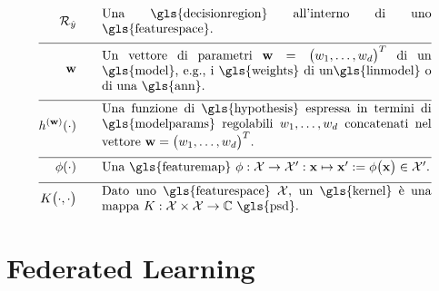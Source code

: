 \begin{align}
\decreg{\hat{\truelabel}} \quad\quad &\parbox{.75\textwidth}{Una \gls{decisionregion} all'interno di uno \gls{featurespace}.  }\nonumber \\[2mm] \hline \nonumber\\[-5mm]  
	\weights  \quad\quad & \parbox{.75\textwidth}{Un vettore di parametri $\weights = \big(\weight_{1},\ldots,\weight_{\featuredim}\big)^{T}$ 
		di un \gls{model}, e.g., i \gls{weights} di un\gls{linmodel} o di una \gls{ann}.}     \nonumber \\[2mm] \hline \nonumber\\[-5mm]
	\hypothesis^{(\weights)}(\cdot)  \quad\quad &\parbox{.75\textwidth}{Una funzione di \gls{hypothesis} espressa in termini di \gls{modelparams} regolabili $\weight_{1},\ldots,\weight_{\featuredim}$ concatenati nel vettore $\weights=\big(\weight_{1},\ldots,\weight_{\featuredim} \big)^{T}$.} \nonumber \\[2mm] \hline \nonumber\\[-5mm]
	\featuremap(\cdot)  \quad\quad & \parbox{.75\textwidth}{Una \gls{featuremap} $\featuremap: \featurespace \rightarrow \featurespace' : \featurevec \mapsto \featurevec' \defeq \featuremap\big( \featurevec \big) \in \featurespace'$.}   \nonumber \\[2mm] \hline \nonumber\\[-5mm]
	\kernelmap{\cdot}{\cdot} \quad\quad & \parbox{.75\textwidth}{Dato uno \gls{featurespace} $\featurespace$, 
		un \gls{kernel} è una mappa $\kernel: \featurespace \times \featurespace \rightarrow \mathbb{C}$ \gls{psd}.}   \nonumber                                                                                                                                                     
\end{align}




\newpage
\section*{Federated Learning}

